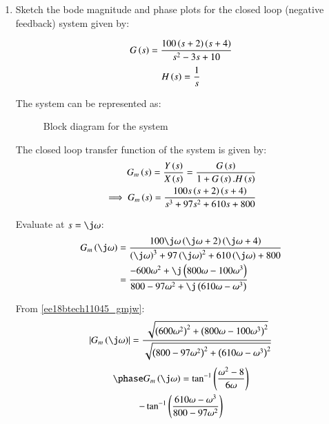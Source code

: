 \begin{enumerate}[label=\thesubsection.\arabic*.,ref=\thesubsection.\theenumi]

\item Sketch the bode magnitude and phase plots for the closed loop (negative feedback) system given by:

\begin{align}
    G\left(s\right) = \frac{100\left(s+2\right)\left(s+4\right)}{s^2 - 3s + 10}
    \label{ee18btech11045_gs}
\end{align}
\begin{align}
    H\left(s\right) = \frac{1}{s}
\end{align}

\solution
The system can be represented as:
\begin{figure}[!ht]
	\begin{center}
		\resizebox{\columnwidth}{!}{}
	\end{center}
\caption{Block diagram for the system}
\label{fig:ee18btech11045_1}
\end{figure}

The closed loop transfer function of the system is given by:
\begin{align}
    G_m\left(s\right) = \frac{Y\left(s\right)}{X\left(s\right)} = \frac{G\left(s\right)}{1 + G\left(s\right).H\left(s\right)}
    \\
    \implies G_m\left(s\right) = \frac{100s\left(s+2\right)\left(s+4\right)}{s^3 + 97s^2 + 610s + 800}
    \label{ee18btech11045_gm}
\end{align}

Evaluate at $s = \j\omega$:
\begin{align}
    G_m\brak{\j\omega} &= \frac{100\j\omega\brak{\j\omega+2}\brak{\j\omega+4}}{\brak{\j\omega}^3 + 97\brak{\j\omega}^2 + 610\brak{\j\omega} + 800}
    \\
    &= \frac{-600\omega^2 + \j\brak{800\omega - 100\omega^3}}{800 - 97\omega^2 + \j\brak{610\omega - \omega^3}}
    \label{ee18btech11045_gmjw}
\end{align}

From \eqref{ee18btech11045_gmjw}:
\begin{align}
    \abs{G_m\brak{\j\omega}} = \frac{\sqrt{\brak{600\omega^2}^2 + \brak{800\omega-100\omega^3}^2}}{\sqrt{\brak{800 - 97\omega^2}^2+\brak{610\omega-\omega^3}^2}}
\end{align}
\begin{multline}
    \phase G_m\brak{\j\omega} = \tan^{-1}\brak{\frac{\omega^2 - 8}{6\omega}}
    \\-\tan^{-1}\brak{\frac{610\omega-\omega^3}{800-97\omega^2}}
\end{multline}    
    


\end{enumerate}
